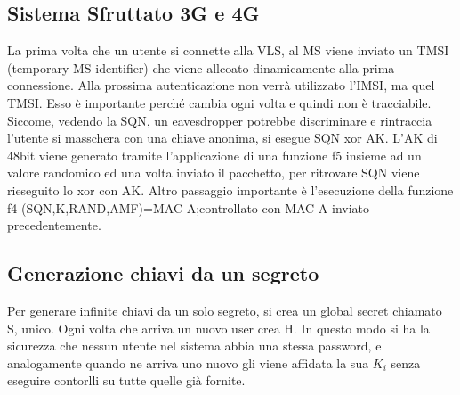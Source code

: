 \documentclass{book}
\theoremstyle{remark}
\begin{document}
\subsection{Sistema Sfruttato 3G e 4G}
La prima volta che un utente si connette alla VLS, al MS viene inviato un TMSI (temporary MS identifier) che viene allcoato dinamicamente alla prima connessione\@. Alla prossima autenticazione non verrà utilizzato l'IMSI, ma quel TMSI\@. Esso è importante perché cambia ogni volta e quindi non è tracciabile\@. Siccome, vedendo la SQN, un eavesdropper potrebbe discriminare e rintraccia l'utente si masschera con una chiave anonima, si esegue SQN xor AK\@.
L'AK di 48bit viene generato tramite l'applicazione di una funzione f5 insieme ad un valore randomico ed una volta inviato il pacchetto, per ritrovare SQN viene rieseguito lo xor con AK\@. Altro passaggio importante è l'esecuzione della funzione f4 (SQN,K,RAND,AMF)=MAC-A; controllato con MAC-A inviato precedentemente\@.
\subsection{Generazione chiavi da un segreto}
Per generare infinite chiavi da un solo segreto, si crea un global secret chiamato S, unico\@. Ogni volta che arriva un nuovo user crea H\@. In questo modo si ha la sicurezza che nessun utente nel sistema abbia una stessa password, e analogamente quando ne arriva uno nuovo gli viene affidata la sua \(K_i\) senza eseguire contorlli su tutte quelle già fornite\@.
\end{document}
